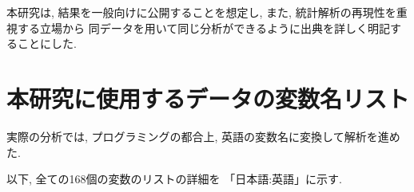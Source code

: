 本研究は,
結果を一般向けに公開することを想定し,
また, 統計解析の再現性を重視する立場から
同データを用いて同じ分析ができるように出典を詳しく明記することにした.




%
%
%
%


%
%
%
%







\chapter{本研究に使用するデータの変数名リスト}
\label{datalist}


実際の分析では, プログラミングの都合上,
英語の変数名に変換して解析を進めた.

以下, 全ての168個の変数のリストの詳細を
「日本語:英語」に示す.


%
%
%
%
%
%
%
%
%
%
%
%
%


